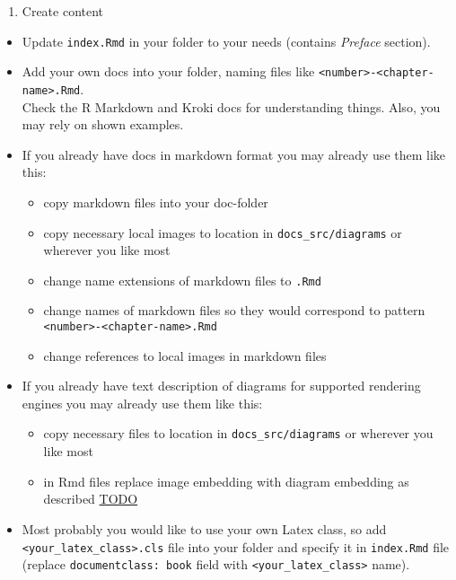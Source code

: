 \documentclass[12pt,a4paper,12pt,oneside,openany]{book}
\providecommand{\tightlist}{%
  \setlength{\itemsep}{0pt}\setlength{\parskip}{0pt}}
\begin{document}
\begin{enumerate}
\def\labelenumi{\arabic{enumi}.}
\setcounter{enumi}{1}
\tightlist
\item
  Create content
\end{enumerate}

\begin{itemize}
\item
  Update \texttt{index.Rmd} in your folder to your needs (contains \emph{Preface} section).
\item
  Add your own docs into your folder, naming files like \texttt{\textless{}number\textgreater{}-\textless{}chapter-name\textgreater{}.Rmd}.\\
  Check the R Markdown and Kroki docs for understanding things. Also, you may rely on shown examples.
\item
  If you already have docs in markdown format you may already use them like this:

  \begin{itemize}
  \tightlist
  \item
    copy markdown files into your doc-folder
  \item
    copy necessary local images to location in \texttt{docs\_src/diagrams} or wherever you like most
  \item
    change name extensions of markdown files to \texttt{.Rmd}
  \item
    change names of markdown files so they would correspond to pattern \texttt{\textless{}number\textgreater{}-\textless{}chapter-name\textgreater{}.Rmd}
  \item
    change references to local images in markdown files
  \end{itemize}
\item
  If you already have text description of diagrams for supported rendering engines you may already use them like this:

  \begin{itemize}
  \tightlist
  \item
    copy necessary files to location in \texttt{docs\_src/diagrams} or wherever you like most
  \item
    in Rmd files replace image embedding with diagram embedding as described \url{TODO}
  \end{itemize}
\item
  Most probably you would like to use your own Latex class, so add \texttt{\textless{}your\_latex\_class\textgreater{}.cls} file into your folder and specify it in \texttt{index.Rmd} file (replace \texttt{documentclass:\ book} field with \texttt{\textless{}your\_latex\_class\textgreater{}} name).
\end{itemize}
\end{document}
